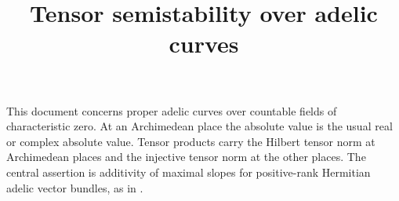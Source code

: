 \documentclass{report}
\title{Tensor semistability over adelic curves}
\author{}
\theoremstyle{definition}
\theoremstyle{remark}
\begin{document}
\maketitle
\tableofcontents
This document concerns proper adelic curves over countable fields of
characteristic zero. At an Archimedean place the absolute value is the usual
real or complex absolute value. Tensor products carry the Hilbert tensor norm
at Archimedean places and the injective tensor norm at the other places.
The central assertion is additivity of maximal slopes for positive-rank
Hermitian adelic vector bundles, as in \cite{bost2026}.










\end{document}
